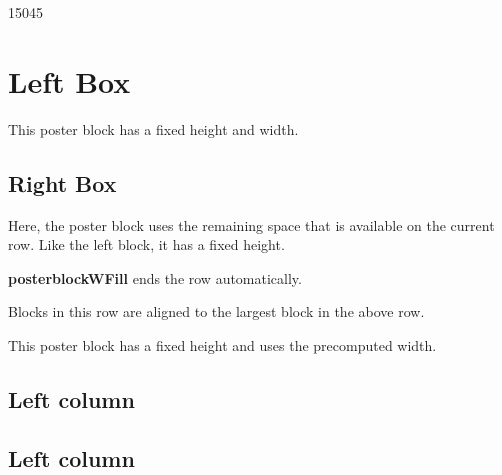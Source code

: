 \documentclass[a4paper, 11pt]{article}
\begin{document}
\begin{poster}
\begin{postercolumns}[2]
    \end{postercolumns}

    \begin{posterrows}[3]

        \begin{posterblockW}{150}{45}
            \section{Left Box}
            This poster block has a fixed height and width.
        \end{posterblockW}

        \begin{posterblockWFill}{35}
            \section{Right Box}
            Here, the poster block uses the remaining space that is available on the current row.
            Like the left block, it has a fixed height.
        \end{posterblockWFill}

        \begin{posterblock}
            {\bf posterblockWFill} ends the row automatically.
        \end{posterblock}

        \begin{posterblock}
            Blocks in this row are aligned to the largest block in the above row.
        \end{posterblock}

        \begin{posterblockH}{30}
            This poster block has a fixed height and uses the precomputed width.
        \end{posterblockH}

    \end{posterrows}

    \begin{postercolumns}[3]
        \begin{posterblock}
            \section{Left column}
        \end{posterblock}
        \begin{posterblock}
            \section{Left column}
        \end{posterblock}


\end{postercolumns}
\end{poster}
\end{document}
